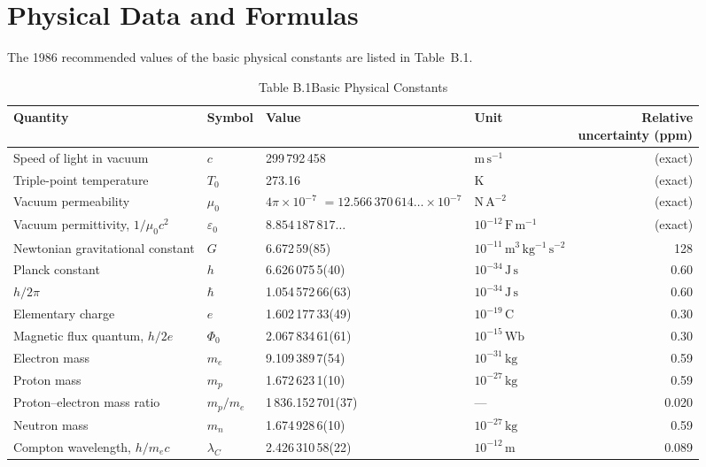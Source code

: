 \chapter{Physical Data and Formulas}

The 1986 recommended values of the basic physical constants are listed in Table~B.1.

\begin{table}[htbp]
\centering
\caption*{Table B.1\quad Basic Physical Constants}
\footnotesize
\setlength{\tabcolsep}{3pt}
\renewcommand{\arraystretch}{1.15}
\begin{tabular*}{\textwidth}{@{\extracolsep{\fill}}l l l l r@{}}
\toprule
Quantity & Symbol & Value & Unit & \shortstack[r]{Relative\\uncertainty (ppm)}\\
\midrule
Speed of light in vacuum & $c$ & 299\,792\,458 & $\mathrm{m\,s^{-1}}$ & (exact)\\
Triple-point temperature & $T_0$ & 273.16 & $\mathrm{K}$ & (exact)\\
Vacuum permeability & $\mu_0$ & \shortstack[l]{$4\pi\times10^{-7}$\\ $=12.566\,370\,614\ldots\times10^{-7}$} & $\mathrm{N\,A^{-2}}$ & (exact)\\
Vacuum permittivity, $1/\mu_0c^2$ & $\varepsilon_0$ & $8.854\,187\,817\ldots$ & $10^{-12}\,\mathrm{F\,m^{-1}}$ & (exact)\\
Newtonian gravitational constant & $G$ & 6.672\,59(85) & $10^{-11}\,\mathrm{m^3\,kg^{-1}\,s^{-2}}$ & 128\\
Planck constant & $h$ & 6.626\,075\,5(40) & $10^{-34}\,\mathrm{J\,s}$ & 0.60\\
$h/2\pi$ & $\hbar$ & 1.054\,572\,66(63) & $10^{-34}\,\mathrm{J\,s}$ & 0.60\\
Elementary charge & $e$ & 1.602\,177\,33(49) & $10^{-19}\,\mathrm{C}$ & 0.30\\
Magnetic flux quantum, $h/2e$ & $\Phi_0$ & 2.067\,834\,61(61) & $10^{-15}\,\mathrm{Wb}$ & 0.30\\
Electron mass & $m_e$ & 9.109\,389\,7(54) & $10^{-31}\,\mathrm{kg}$ & 0.59\\
Proton mass & $m_p$ & 1.672\,623\,1(10) & $10^{-27}\,\mathrm{kg}$ & 0.59\\
Proton--electron mass ratio & $m_p/m_e$ & 1\,836.152\,701(37) & --- & 0.020\\
Neutron mass & $m_n$ & 1.674\,928\,6(10) & $10^{-27}\,\mathrm{kg}$ & 0.59\\
Compton wavelength, $h/m_ec$ & $\lambda_C$ & 2.426\,310\,58(22) & $10^{-12}\,\mathrm{m}$ & 0.089\\

\end{tabular*}
\end{table}
